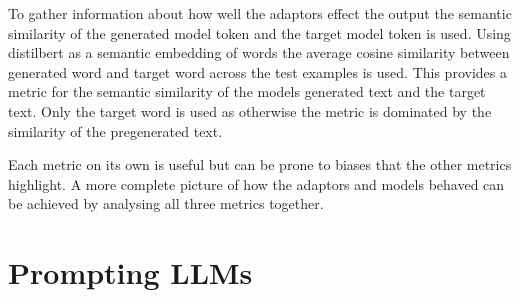 To gather information about how well the adaptors effect the output the semantic similarity of the generated model token and the target model token is used.
Using distilbert \citep{distilbert} as a semantic embedding of words the average cosine similarity between generated word and target word across the test examples is used.
This provides a metric for the semantic similarity of the models generated text and the target text.
Only the target word is used as otherwise the metric is dominated by the similarity of the pregenerated text.

Each metric on its own is useful but can be prone to biases that the other metrics highlight.
A more complete picture of how the adaptors and models behaved can be achieved by analysing all three metrics together.

\section{Prompting LLMs}
